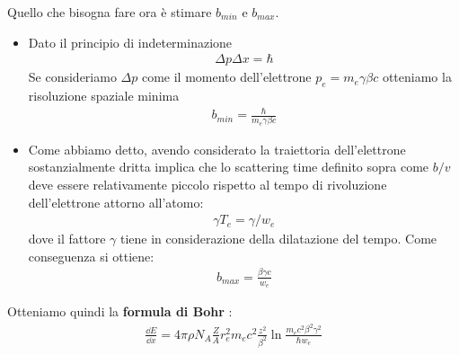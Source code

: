 Quello che bisogna fare ora è stimare $b_{min}$ e $b_{max}$.\\
\begin{itemize}
        \item Dato il principio di indeterminazione 
                \begin{align*}
                    \Delta p\Delta x = \hbar
                \end{align*}
            Se consideriamo $\Delta p$ come il momento dell'elettrone $p_{e}=m_{e}\gamma\beta c$
            otteniamo la risoluzione spaziale minima 
            \begin{align*}
                b_{min} = \frac{\hbar}{m_{e}\gamma\beta c}
            \end{align*}
    \item Come abbiamo detto, avendo considerato la traiettoria dell'elettrone sostanzialmente dritta 
        implica che lo scattering time definito sopra come $b/v$ deve essere relativamente piccolo rispetto al 
        tempo di rivoluzione dell'elettrone attorno all'atomo:
        \begin{align*}
            \gamma T_{e} = \gamma/w_{e}
        \end{align*}
        dove il fattore $\gamma$ tiene in considerazione della dilatazione del tempo.
        Come conseguenza si ottiene: 
        \begin{align*}
            b_{max} = \frac{\beta\gamma c}{w_{e}}
        \end{align*}
\end{itemize}
Otteniamo quindi la \textbf{formula di Bohr} : 
\begin{align*}
        \frac{\dd{E}}{\dd{x}} = 4\pi\rho N_{A}\frac{Z}{A}r_{e}^2m_{e}c^2\frac{z^2}{\beta^2}\ln{\frac{m_{e}c^2\beta^2\gamma^2}{\hbar w_{e}}}
\end{align*}
